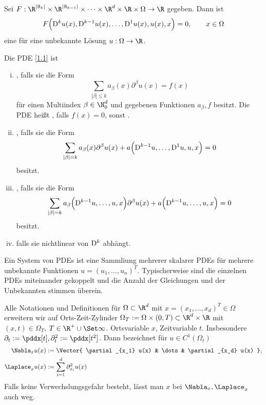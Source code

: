 \begin{df} \label{1.8}
	Sei $F: \R^{|\mathbb{B}_k|} \times \R^{|\mathbb{B}_{k-1}|} \times \dotsb \times \R^d \times \R \times \Omega \to \R$ gegeben.
	Dann ist
	\begin{equation} \label{eq:1.1}
		F\Big(\mathrm{D}^k u(x), \mathrm{D}^{k-1} u(x), \dotsc, \mathrm{D}^1 u(x), u(x), x\Big) = 0,
		\qquad x \in \Omega
	\end{equation}
	eine  für eine unbekannte Lösung $u: \Omega \to \R$.
\end{df}

\begin{df} \label{1.9}
	Die PDE \eqref{1.1} ist
	\begin{enumerate}[i)]
		\item
			, falls sie die Form
			\[
				\sum_{|\beta| \le k} a_\beta(x) \partial^\beta u(x) = f(x)
			\]
			für einen Multiindex $\beta \in \N_0^d$ und gegebenen Funktionen $a_\beta, f$ besitzt.
			Die PDE heißt , falls $f(x) = 0$, sonst .
		\item
			, falls sie die Form
			\[
				\sum_{|\beta| = k} a_\beta(x) \partial^\beta u(x) + a \Big(\mathrm{D}^{k-1} u, \dotsc, \mathrm{D}^1 u, u, x\Big) = 0
			\]
			besitzt.
		\item
			, falls sie die Form
			\[
				\sum_{|\beta| = k} a_\beta\Big(\mathrm{D}^{k-1}u, \dotsc, u, x\Big) \partial^\beta u(x) + a\Big(\mathrm{D}^{k-1} u, \dotsc, u, x\Big) = 0
			\]
			besitzt.
		\item
			 falls sie nichtlinear von $\mathrm{D}^k$ abhängt.
	\end{enumerate}
	\begin{note}[Systeme]
		Ein System von PDEs ist eine Sammliung mehrerer skalarer PDEs für mehrere unbekannte Funktionen $u = (u_1, \dotsc, u_n)^T$.
		Typischerweise sind die einzelnen PDEs miteinander gekoppelt und die Anzahl der Gleichungen und der Unbekannten stimmen überein. 
	\end{note}
	\begin{note}
		Alle Notationen und Definitionen für $\Omega \subset \R^d$ mit $x = (x_1, \dotsc, x_d)^T \in \Omega$ erweitern wir auf Orts-Zeit-Zylinder $\Omega_T := \Omega \times (0, T) \subset \R^d \times \R$ mit $(x,t) \in \Omega_T$, $T \in \R^+ \cup \Set \infty$.
		Ortsvariable $x$, Zeitvariable $t$.
		Insbesondere $\partial_t := \pddx[t], \partial_t^2 := \pddx[t^2]$.
		Dann bezeichnet für $u \in C^1(\Omega_t)$
		\begin{align*}
			\Nabla_x u(x) &:= \Vector{ \partial_{x_1} u(x) & \dots & \partial_{x_d} u(x) }, \\
			\Laplace_x u(x) &:= \sum_{i=1}^d \partial_{x_i}^2 u(x)
		\end{align*}
		Falls keine Verwechslungsgefahr besteht, lässt man $x$ bei $\Nabla_x, \Laplace_x$ auch weg.
	\end{note}
\end{df}

